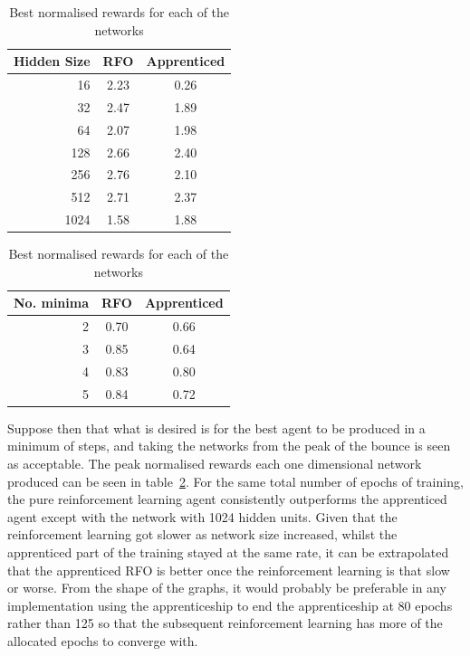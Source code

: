 \begin{table}[hbtp]
\centering
\begin{tabular}{r | cc}
Hidden Size & RFO & Apprenticed \\
\hline
16 & 2.23 & 0.26 \\
32 & 2.47 & 1.89 \\
64 & 2.07 & 1.98\\
128 & 2.66 & 2.40 \\
256 & 2.76 & 2.10 \\
512 & 2.71 & 2.37 \\
1024 & 1.58 & 1.88 \\

\end{tabular}
%
\begin{tabular}{r | cc}
No. minima & RFO & Apprenticed \\
\hline
2 & 0.70 & 0.66 \\
3 & 0.85 &  0.64 \\
4 &0.83  & 0.80 \\
5 & 0.84 & 0.72 \\

\end{tabular}


\caption{Best normalised rewards for each of the networks}
\label{tab:compare}

\end{table}

Suppose then that what is desired is for the best agent to be produced in a minimum of steps, and taking the networks from the peak of the bounce is seen as acceptable. The peak normalised rewards each one dimensional network produced can be seen in table~\ref{tab:compare}. For the same total number of epochs of training, the pure reinforcement learning agent consistently outperforms the apprenticed agent except with the network with 1024 hidden units. Given that the reinforcement learning got slower as network size increased, whilst the apprenticed part of the training stayed at the same rate, it can be extrapolated that the apprenticed RFO is better once the reinforcement learning is that slow or worse. From the shape of the graphs, it would probably be preferable in any implementation using the apprenticeship to end the apprenticeship at 80 epochs rather than 125 so that the subsequent reinforcement learning has more of the allocated epochs to converge with.

